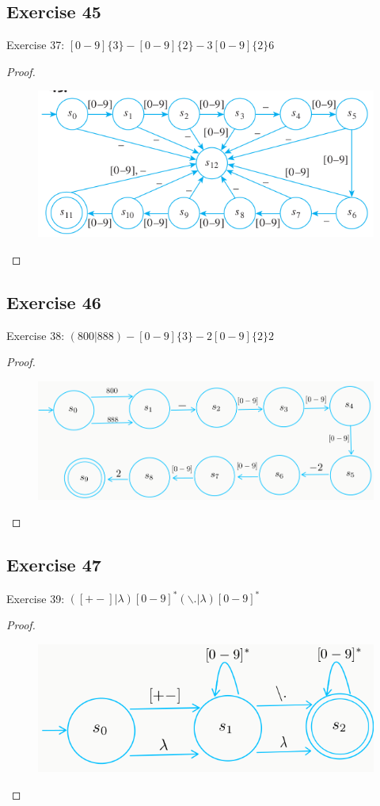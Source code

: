 \documentclass[14pt]{extarticle}
\begin{document}
\subsection{Exercise 45}
Exercise 37: \([0 - 9]\{3\} - [0 - 9]\{2\} - 3[0 - 9]\{2\}6\)
\begin{proof}
\begin{figure}[ht!]
\centering
\includegraphics[scale=0.5]{../images/12.2.45.png}
\end{figure}
\end{proof}

\subsection{Exercise 46}
Exercise 38: \((800|888)-[0-9]\{3\}-2[0-9]\{2\}2\)
\begin{proof}
\begin{figure}[ht!]
\centering
\includegraphics[scale=0.4]{../images/12.2.46.png}
\end{figure}
\end{proof}

\subsection{Exercise 47}
Exercise 39: \(([+ -] | \lambda)[0 - 9]^* (\backslash. | \lambda)[0 - 9]^*\)
\begin{proof}
\begin{figure}[ht!]
\centering
\includegraphics[scale=0.4]{../images/12.2.47.png}
\end{figure}
\end{proof}
\end{document}

